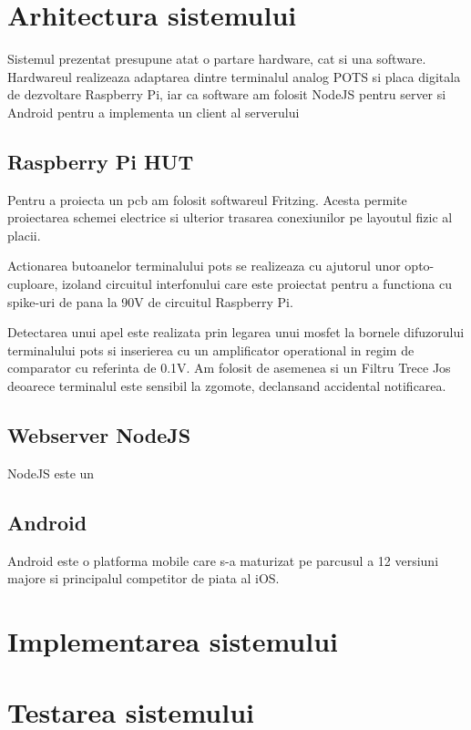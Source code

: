 \section {Arhitectura sistemului}

Sistemul prezentat presupune atat o partare hardware, cat si una software. Hardwareul realizeaza adaptarea dintre terminalul analog POTS si placa digitala de dezvoltare Raspberry Pi, iar ca software am folosit NodeJS pentru server si Android pentru a implementa un client al serverului

\subsection {Raspberry Pi HUT}

Pentru a proiecta un \acrfull{pcb} am folosit softwareul Fritzing. Acesta permite proiectarea schemei electrice si ulterior trasarea conexiunilor pe layoutul fizic al placii.

Actionarea butoanelor terminalului \acrshort{pots} se realizeaza cu ajutorul unor opto-cuploare, izoland circuitul interfonului care este proiectat pentru a functiona cu spike-uri de pana la 90V de circuitul Raspberry Pi.

Detectarea unui apel este realizata prin legarea unui \acrfull{mosfet} la bornele difuzorului terminalului \acrshort{pots} si inserierea cu un amplificator operational in regim de comparator cu referinta de 0.1V. Am folosit de asemenea si un Filtru Trece Jos deoarece terminalul este sensibil la zgomote, declansand accidental notificarea.

\subsection {Webserver NodeJS}

NodeJS este un

\subsection {Android}

Android este o platforma mobile care s-a maturizat pe parcusul a 12 versiuni majore si principalul competitor de piata al iOS.


\section {Implementarea sistemului}


\section {Testarea sistemului}